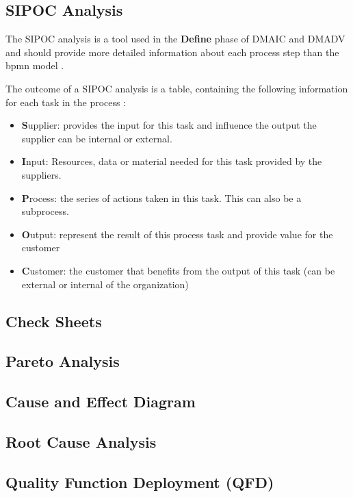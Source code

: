 \subsection{SIPOC Analysis}
The SIPOC analysis is a tool used in the \textbf{Define} phase of \gls{DMAIC} and \gls{DMADV} and should provide more detailed information about each process step than the \gls{bpmn} model  \cite{vom2014handbook}. 

The outcome of a SIPOC analysis is a table, containing the following information for each task in the process \cite{toutenburg2008six}: 
\begin{itemize}
	\item \textbf{S}upplier: provides the input for this task and influence the output the supplier can be internal or external. 
	\item \textbf{I}nput: Resources, data or material needed for this task provided by the suppliers. 
	\item \textbf{P}rocess: the series of actions taken in this task. This can also be a subprocess. 
	\item \textbf{O}utput: represent the result of this process task and provide value for the customer
	\item \textbf{C}ustomer: the customer that benefits from the output of this task (can be external or internal of the organization)
\end{itemize}



\subsection{Check Sheets}

\subsection{Pareto Analysis}

\subsection{Cause and Effect Diagram}

\subsection{Root Cause Analysis}

\subsection{Quality Function Deployment (QFD)}

